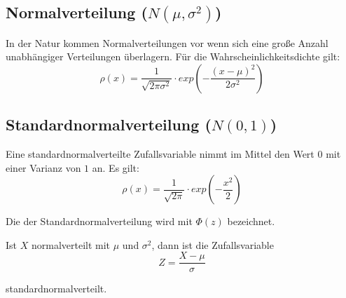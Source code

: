 \subsection{Normalverteilung ($N(\mu, \sigma^2)$)}

In der Natur kommen Normalverteilungen vor wenn sich eine große Anzahl
unabhängiger Verteilungen überlagern. Für die Wahrscheinlichkeitsdichte gilt:
\[
\rho(x) = \frac{1}{\sqrt{2\pi\sigma^2}}\cdot exp(-\frac{(x-\mu)^2}{2\sigma^2})
\]

\subsection{Standardnormalverteilung ($N(0,1)$)}
\label{vert-stdnormal}

Eine standardnormalverteilte Zufallsvariable nimmt im Mittel den Wert $0$ mit
einer Varianz von $1$ an. Es gilt:
\[
\rho(x) = \frac{1}{\sqrt{2\pi}}\cdot exp(-\frac{x^2}{2})
\]

Die  der Standardnormalverteilung wird mit $\Phi(z)$ bezeichnet.

Ist $X$ normalverteilt mit $\mu$ und $\sigma^2$, dann ist die Zufallsvariable
\[
Z=\frac{X-\mu}{\sigma}
\]

standardnormalverteilt.

